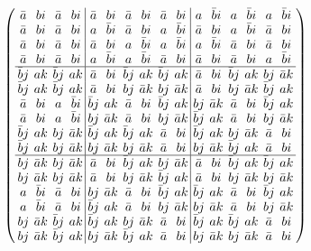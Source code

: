 \documentclass{beamer}
\begin{document}
\begin{frame}
  \[
    \arraycolsep=2.0pt\def\arraystretch{0.75}
    \left(
      \begin{array}{cccc|cccccc|cccccc}
        \bar{a}&bi&\bar{a}&bi&\bar{a}&bi&\bar{a}&bi&\bar{a}&bi& a&\bar{b}i& a&\bar{b}i& a&\bar{b}i\\
        \bar{a}&bi&\bar{a}&bi& a&\bar{b}i&\bar{a}&bi& a&\bar{b}i&\bar{a}&bi& a&\bar{b}i&\bar{a}&bi\\
        \bar{a}&bi&\bar{a}&bi&\bar{a}&bi& a&\bar{b}i& a&\bar{b}i& a&\bar{b}i&\bar{a}&bi&\bar{a}&bi\\
        \bar{a}&bi&\bar{a}&bi& a&\bar{b}i& a&\bar{b}i&\bar{a}&bi&\bar{a}&bi&\bar{a}&bi& a&\bar{b}i\\\hline
        \bar{b}j&ak&\bar{b}j&ak&\bar{a}&bi&\bar{b}j&ak&\bar{b}j&ak&\bar{a}&bi&\bar{b}j&ak&bj&\bar{a}k\\
        \bar{b}j&ak&\bar{b}j&ak&\bar{a}&bi&bj&\bar{a}k&bj&\bar{a}k&\bar{a}&bi&bj&\bar{a}k&\bar{b}j&ak\\
        \bar{a}&bi& a&\bar{b}i&\bar{b}j&ak&\bar{a}&bi&\bar{b}j&ak&bj&\bar{a}k&\bar{a}&bi&\bar{b}j&ak\\
        \bar{a}&bi& a&\bar{b}i&bj&\bar{a}k&\bar{a}&bi&bj&\bar{a}k&\bar{b}j&ak&\bar{a}&bi&bj&\bar{a}k\\
        \bar{b}j&ak&bj&\bar{a}k&\bar{b}j&ak&\bar{b}j&ak&\bar{a}&bi&\bar{b}j&ak&bj&\bar{a}k&\bar{a}&bi\\
        \bar{b}j&ak&bj&\bar{a}k&bj&\bar{a}k&bj&\bar{a}k&\bar{a}&bi&bj&\bar{a}k&\bar{b}j&ak&\bar{a}&bi\\\hline
        bj&\bar{a}k&bj&\bar{a}k&\bar{a}&bi&\bar{b}j&ak&bj&\bar{a}k&\bar{a}&bi&\bar{b}j&ak&\bar{b}j&ak\\
        bj&\bar{a}k&bj&\bar{a}k&\bar{a}&bi&bj&\bar{a}k&\bar{b}j&ak&\bar{a}&bi&bj&\bar{a}k&bj&\bar{a}k\\
        a&\bar{b}i&\bar{a}&bi&bj&\bar{a}k&\bar{a}&bi&\bar{b}j&ak&\bar{b}j&ak&\bar{a}&bi&\bar{b}j&ak\\
        a&\bar{b}i&\bar{a}&bi&\bar{b}j&ak&\bar{a}&bi&bj&\bar{a}k&bj&\bar{a}k&\bar{a}&bi&bj&\bar{a}k\\
        bj&\bar{a}k&\bar{b}j&ak&\bar{b}j&ak&bj&\bar{a}k&\bar{a}&bi&\bar{b}j&ak&\bar{b}j&ak&\bar{a}&bi\\
        bj&\bar{a}k&\bar{b}j&ak&bj&\bar{a}k&\bar{b}j&ak&\bar{a}&bi&bj&\bar{a}k&bj&\bar{a}k&\bar{a}&bi\\
      \end{array}
    \right)
  \]

\end{frame}
\end{document}
